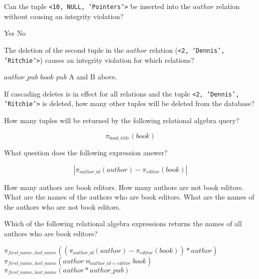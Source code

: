 \documentclass[10pt,a4paper]{exam}
\begin{document}
\begin{questions}
\question[4] Can the tuple {\tt <10, NULL, 'Pointers'>} be inserted into the $author$ relation without causing an integrity violation?

\begin{choices}
\correctchoice Yes
\choice No
\end{choices}

\question[4] The deletion of the second tuple in the $author$ relation ({\tt <2, 'Dennis', 'Ritchie'>}) causes an integrity violation for which relations?

\begin{choices}
\choice $author\_pub$
\choice $book$
\choice $pub$
\correctchoice A and B above.
\end{choices}


\question[4] If cascading deletes is in effect for all relations and the tuple {\tt <2, 'Dennis', 'Ritchie'>} is deleted, how many other tuples will be deleted from the database?

\begin{choices}
\end{choices}

\question[4] How many tuples will be returned by the following relational algebra query?

\[
\pi_{book\_title}(book)
\]

\begin{choices}
\end{choices}

\newpage

\question[4] What question does the following expression answer?

\[
|\pi_{author\_id}(author)  -  \pi_{editor}(book)|
\]

\begin{choices}
\choice How many authors are book editors.
\correctchoice How many authors are not book editors.
\choice What are the names of the authors who are book editors.
\choice What are the names of the authors who are not book editors.
\end{choices}

\question[4] Which of the following relational algebra expressions returns the names of all authors who are book editors?

\begin{choices}
\choice $\pi_{first\_name, last\_name}((\pi_{author\_id}(author)  -  \pi_{editor}(book)) * author)$
\correctchoice $\pi_{first\_name, last\_name}(author \bowtie_{author\_id = editor} book)$
\choice $\pi_{first\_name, last\_name}(author * author\_pub)$
\end{choices}


\end{questions}
\end{document}
